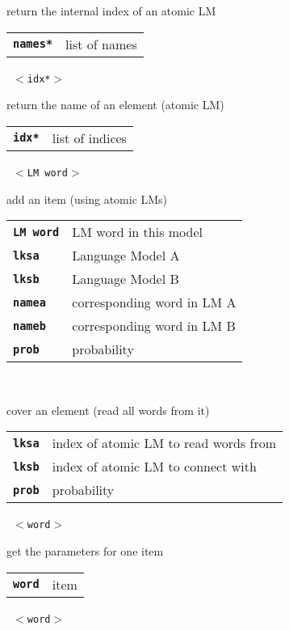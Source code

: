 \begin{description}
\begin{description}
        return the internal index of an atomic LM

      \begin{tabular}{ll}
 \texttt{\textbf{names*}} & list of names \\
      \end{tabular}
       \texttt{ $<$idx*$>$} \

        return the name of an element (atomic LM)

      \begin{tabular}{ll}
 \texttt{\textbf{idx*}} & list of indices \\
      \end{tabular}
       \texttt{ $<$LM word$>$     } \

        add an item (using atomic LMs)

      \begin{tabular}{ll}
 \texttt{\textbf{LM word}} &  LM word in this model  \\
 \texttt{\textbf{lksa}} &      Language Model A  \\
 \texttt{\textbf{lksb}} &      Language Model B  \\
 \texttt{\textbf{namea}} &     corresponding word in LM A  \\
 \texttt{\textbf{nameb}} &     corresponding word in LM B  \\
 \texttt{\textbf{prob}} &      probability  \\
      \end{tabular}
       \texttt{   } \

        cover an element (read all words from it)

      \begin{tabular}{ll}
 \texttt{\textbf{lksa}} &  index of atomic LM to read words from  \\
 \texttt{\textbf{lksb}} &  index of atomic LM to connect with  \\
 \texttt{\textbf{prob}} &  probability  \\
      \end{tabular}
       \texttt{ $<$word$>$} \

        get the parameters for one item

      \begin{tabular}{ll}
 \texttt{\textbf{word}} &  item  \\
      \end{tabular}
       \texttt{ $<$word$>$} \


\end{description}
\end{description}
